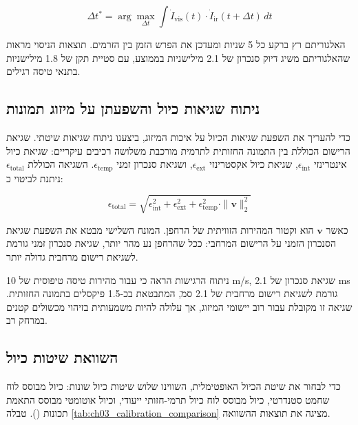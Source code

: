 \begin{equation}
\Delta t^* = \arg\max_{\Delta t} \int \dot{I}_{\text{vis}}(t) \cdot \dot{I}_{\text{ir}}(t + \Delta t) \, dt
\label{eq:ch03_temporal_sync}
\end{equation}

האלגוריתם רץ ברקע כל 5 שניות ומעדכן את הפרש הזמן בין הזרמים. תוצאות הניסוי מראות שהאלגוריתם משיג דיוק סנכרון של 2.1 מילישניות בממוצע, עם סטיית תקן של 1.8 מילישניות בתנאי טיסה רגילים.

\subsection{ניתוח שגיאות כיול והשפעתן על מיזוג תמונות}
\label{sec:ch03_calibration_error_analysis}

כדי להעריך את השפעת שגיאות הכיול על איכות המיזוג, ביצענו ניתוח שגיאות שיטתי. שגיאת הרישום הכוללת בין התמונה החזותית לתרמית מורכבת משלושה רכיבים עיקריים: שגיאת כיול אינטרינזי $\epsilon_{\text{int}}$, שגיאת כיול אקסטרינזי $\epsilon_{\text{ext}}$, ושגיאת סנכרון זמני $\epsilon_{\text{temp}}$. השגיאה הכוללת $\epsilon_{\text{total}}$ ניתנת לביטוי כ:

\begin{equation}
\epsilon_{\text{total}} = \sqrt{\epsilon_{\text{int}}^2 + \epsilon_{\text{ext}}^2 + \epsilon_{\text{temp}}^2 \cdot \|\mathbf{v}\|_2^2}
\label{eq:ch03_total_error}
\end{equation}

כאשר $\mathbf{v}$ הוא וקטור המהירות הזוויתית של הרחפן. המונח השלישי מבטא את השפעת שגיאת הסנכרון הזמני על הרישום המרחבי: ככל שהרחפן נע מהר יותר, שגיאת סנכרון זמני גורמת לשגיאת רישום מרחבית גדולה יותר.

ניתוח הרגישות הראה כי עבור מהירות טיסה טיפוסית של 10 m/s, שגיאת סנכרון של 2.1 ms גורמת לשגיאת רישום מרחבית של 2.1 ס\"מ, המתבטאת בכ-1.5 פיקסלים בתמונה החזותית. שגיאה זו מקובלת עבור רוב יישומי המיזוג, אך עלולה להיות משמעותית בזיהוי מכשולים קטנים במרחק רב.

\subsection{השוואת שיטות כיול}
\label{sec:ch03_calibration_comparison}

כדי לבחור את שיטת הכיול האופטימלית, השווינו שלוש שיטות כיול שונות: כיול מבוסס לוח שחמט סטנדרטי, כיול מבוסס לוח כיול תרמי-חזותי ייעודי, וכיול אוטומטי מבוסס התאמת תכונות (). טבלה \ref{tab:ch03_calibration_comparison} מציגה את תוצאות ההשוואה.

